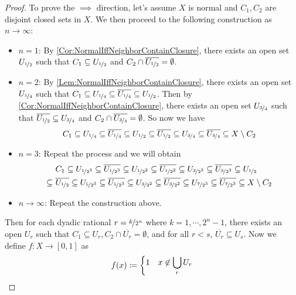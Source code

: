 \documentclass[screen,single]{techreport}
\numberwithin{equation}{section}
\begin{document}
\begin{proof}
	To prove the $\implies$ direction, let's assume $X$ is normal and $C_1,C_2$ are disjoint closed sets in $X$. We then proceed to the following construction as $n \to \infty$:
	\begin{itemize}
		\item $n=1$: By \cref{Cor:NormalIffNeighborContainClosure}, there exists an open set $U_{\nicefrac{1}{2}}$ such that $C_1 \subseteq U_{\nicefrac{1}{2}}$ and $C_2 \cap \overline{U_{\nicefrac{1}{2}}} = \emptyset$.
		\item $n=2$: By \cref{Lem:NormalIffNeighborContainClosure}, there exists an open set $U_{\nicefrac{1}{4}}$ such that $C_1 \subseteq U_{\nicefrac{1}{4}} \subseteq \overline{U_{\nicefrac{1}{4}}} \subseteq U_{\nicefrac{1}{2}}$.
		Then by \cref{Cor:NormalIffNeighborContainClosure}, there exists an open set $U_{\nicefrac{3}{4}}$ such that $\overline{U_{\nicefrac{1}{2}}} \subseteq U_{\nicefrac{3}{4}}$ and $C_2 \cap \overline{U_{\nicefrac{3}{4}}} = \emptyset$.
		So now we have
		\[
		C_1 \subseteq U_{\nicefrac{1}{4}} \subseteq \overline{U_{\nicefrac{1}{4}}} \subseteq U_{\nicefrac{1}{2}} \subseteq \overline{U_{\nicefrac{1}{2}}} \subseteq   U_{\nicefrac{3}{4}} \subseteq \overline{U_{\nicefrac{3}{4}}} \subseteq X \setminus C_2
		\]
		\item $n = 3$: Repeat the process and we will obtain
		\begin{align*}
		& C_1 \subseteq U_{\nicefrac{1}{2^3}} \subseteq \overline{U_{\nicefrac{1}{2^3}}} \subseteq U_{\nicefrac{1}{2^2}} \subseteq \overline{U_{\nicefrac{1}{2^2}} } \subseteq U_{\nicefrac{3}{2^3}} \subseteq \overline{U_{\nicefrac{3}{2^3}}} \subseteq U_{\nicefrac{1}{2}} \\
		\subseteq ~ & \overline{U_{\nicefrac{1}{2}}} \subseteq U_{\nicefrac{5}{2^3}} \subseteq \overline{U_{\nicefrac{5}{2^3}}} \subseteq U_{\nicefrac{3}{2^2}} \subseteq \overline{U_{\nicefrac{3}{2^2}}} \subseteq U_{\nicefrac{7}{2^3}} \subseteq \overline{U_{\nicefrac{7}{2^3}}} \subseteq X \setminus C_2
		\end{align*}
		\item $n \to \infty$: Repeat the construction above.
	\end{itemize}
	Then for each dyadic rational $r = \nicefrac{k}{2^n}$ where $k=1,\cdots,2^n-1$, there exists an open $U_r$ such that $C_1 \subseteq U_r, C_2 \cap \overline{U_r} = \emptyset$, and for all $r < s$, $\overline{U_r} \subseteq U_s$.
	Now we define $f : X \to [0,1]$ as
	\[
	f(x) \coloneqq \begin{dcases}
 		1 & x \not\in \bigcup_r U_r \\

\end{dcases}\]
\end{proof}
\end{document}
